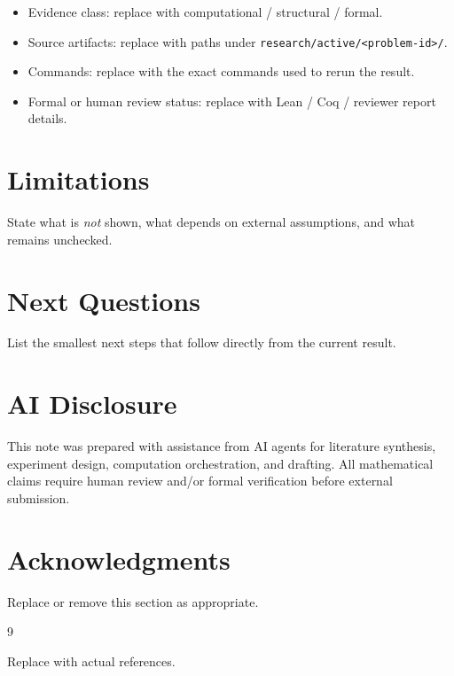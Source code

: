 \documentclass[11pt]{article}
\begin{document}
\begin{itemize}[leftmargin=1.5em]
  \item Evidence class: replace with computational / structural / formal.
  \item Source artifacts: replace with paths under \texttt{research/active/<problem-id>/}.
  \item Commands: replace with the exact commands used to rerun the result.
  \item Formal or human review status: replace with Lean / Coq / reviewer report details.
\end{itemize}

\section{Limitations}
State what is \emph{not} shown, what depends on external assumptions, and what remains unchecked.

\section{Next Questions}
List the smallest next steps that follow directly from the current result.

\section*{AI Disclosure}
This note was prepared with assistance from AI agents for literature synthesis,
experiment design, computation orchestration, and drafting.
All mathematical claims require human review and/or formal verification before external submission.

\section*{Acknowledgments}
Replace or remove this section as appropriate.

\begin{thebibliography}{9}

Replace with actual references.

\end{thebibliography}
\end{document}
